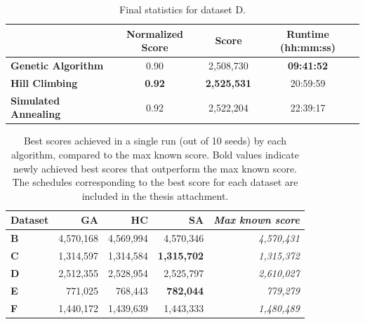 \bigskip

\begin{table}[h]
\centering\footnotesize\sf
\begin{tabular}{lccc}
\toprule
& Normalized Score & Score & Runtime (hh:mm:ss) \\
\midrule
\textcolor{myblue}{\textbf{Genetic Algorithm}} & 0.90 & 2,508,730 & \textbf{09:41:52} \\
\textcolor{myorange}{\textbf{Hill Climbing}} & \textbf{0.92} & \textbf{2,525,531} & 20:59:59 \\
\textcolor{mygreen}{\textbf{Simulated Annealing}} & 0.92 & 2,522,204 & 22:39:17 \\
\bottomrule
\end{tabular}
\caption[Statistics for dataset D]{
    Final statistics for dataset D.
}
\label{tab:dataset_d_results}
\end{table}

\begin{table}
\centering\footnotesize\sf

\begin{tabular}{lr@{\hspace{0.5cm}}r@{\hspace{0.5cm}}r@{\hspace{0.5cm}}r}
\toprule
Dataset & \textcolor{myblue}{\textbf{GA}} & \textcolor{myorange}{\textbf{HC}} & \textcolor{mygreen}{\textbf{SA}} & \textit{Max known score} \\
\midrule
\textbf{B} & 4,570,168 & 4,569,994 & 4,570,346 & \textit{4,570,431} \\
\textbf{C} & 1,314,597 & 1,314,584 & \textbf{1,315,702} & \textit{1,315,372} \\
\textbf{D} & 2,512,355 & 2,528,954 & 2,525,797 & \textit{2,610,027} \\
\textbf{E} & 771,025 & 768,443 & \textbf{782,044} & \textit{779,279} \\
\textbf{F} & 1,440,172 & 1,439,639 & 1,443,333 & \textit{1,480,489} \\
\bottomrule
\end{tabular}

\caption[Best scores]{
    Best scores achieved in a single run (out of 10 seeds) by each algorithm, compared to the max known score. Bold values indicate newly achieved best scores that outperform the max known score. The schedules corresponding to the best score for each dataset are included in the thesis attachment.
}
\label{tab:best_scores}
\end{table}


